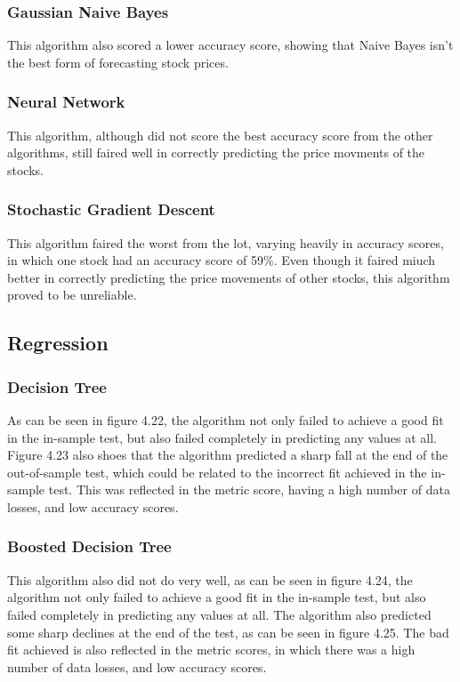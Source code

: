 \subsubsection{Gaussian Naive Bayes}
This algorithm also scored a lower accuracy score, showing that Naive Bayes isn't the best form of forecasting stock prices.

\subsubsection{Neural Network}
This algorithm, although did not score the best accuracy score from the other algorithms, still faired well in correctly predicting the price movments of the stocks.

\subsubsection{Stochastic Gradient Descent}
This algorithm faired the worst from the lot, varying heavily in accuracy scores, in which one stock had an accuracy score of 59\%. Even though it faired miuch better in correctly predicting the price movements of other stocks, this algorithm proved to be unreliable.

\subsection{Regression}

\subsubsection{Decision Tree}
As can be seen in figure 4.22, the algorithm not only failed to achieve a good fit in the in-sample test, but also failed completely in predicting any values at all. Figure 4.23 also shoes that the algorithm predicted a sharp fall at the end of the out-of-sample test, which could be related to the incorrect fit achieved in the in-sample test. This was reflected in the metric score, having a high number of data losses, and low accuracy scores.

\subsubsection{Boosted Decision Tree}
This algorithm also did not do very well, as can be seen in figure 4.24, the algorithm not only failed to achieve a good fit in the in-sample test, but also failed completely in predicting any values at all. The algorithm also predicted some sharp declines at the end of the test, as can be seen in figure 4.25. The bad fit achieved is also reflected in the metric scores, in which there was a high number of data losses, and low accuracy scores.

